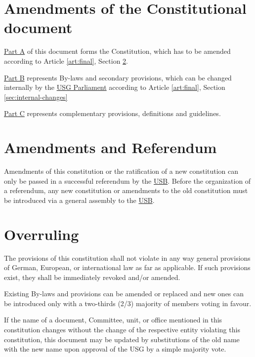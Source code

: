 \label{art:final}

\section{Amendments of the Constitutional document}\label{sec:amend}
\begin{parenum}
\item \hyperref[PartA]{Part A} of this document forms the Constitution, which has to be amended according to Article \protect\ref{art:final}, Section \protect\ref{Ammendments}.
\item \protect\hyperref[PartB]{Part B} represents By-laws and secondary provisions, which can be changed internally by the \protect\hyperref[USGParliamentDef]{USG Parliament} according to Article \protect\ref{art:final}, Section \protect\ref{sec:internal-changes}
\item \protect\hyperref[PartC]{Part C} represents complementary provisions, definitions and guidelines.
\end{parenum}

\section{Amendments and Referendum}
\label{Ammendments}
Amendments of this constitution or the ratification of a new constitution can only be passed in a successful referendum by the \hyperref[studentbody]{USB}. Before the organization of a referendum, any new constitution or amendments to the old constitution must be introduced via a general assembly to the \hyperref[studentbody]{USB}. 

\section{Overruling} 
The provisions of this constitution shall not violate in any way general provisions of German, European, or international law as far as applicable. If such provisions exist, they shall be immediately revoked and/or amended.

\label{sec:internal-changes}
\begin{parenum}
\item Existing By-laws and provisions can be amended or replaced and new ones can be introduced only with a two-thirds (2/3) majority of members voting in favour.
\item If the name of a document, Committee, unit, or office mentioned in this constitution changes without the change of the respective entity violating this constitution, this document may be updated by substitutions of the old name with the new name upon approval of the USG by a simple majority vote.
\end{parenum}


